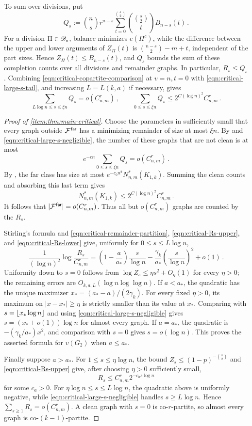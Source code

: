 To sum over divisions, put
$$Q_s:=\binom ns r^{n-s}\sum_{t=0}^{\binom s2}\binom{\binom s2}{t}B_{n-s}(t)\,.$$
For a division $\Pi\in{\mathscr D}_s$, balance minimizes $e(\Pi^c)$, while the difference between the upper and lower arguments of $Z_\Pi(t)$ is $\binom{n-s}{2}-m+t$, independent of the part sizes. Hence $Z_\Pi(t)\leq B_{n-s}(t)$, and $Q_s$ bounds the sum of these completion counts over all divisions and remainder graphs. In particular, $R_s\leq Q_s$. Combining \eqref{eqn:critical-copartite-comparison} at $v=n,t=0$ with \eqref{eqn:critical-large-s-tail}, and increasing $L=L(k,a)$ if necessary, gives
\begin{equation}\label{eqn:critical-large-s-negligible}
\sum_{L\log n\leq s\leq\xi n}Q_s=o(C^r_{n,m})\,,\qquad \sum_{0\leq s\leq\xi n}Q_s\leq2^{C(\log n)^2}C^r_{n,m}\,.
\end{equation}

\begin{proof}[Proof of  \ref{item:thm:main-critical}]
Choose the parameters in  sufficiently small that every graph outside ${\mathcal F}^{\hspace{0.2mm}\mathsf{far}}$ has a minimizing remainder of size at most $\xi n$. By  and \eqref{eqn:critical-large-s-negligible}, the number of these graphs that are not clean is at most
$$e^{-cn}\sum_{0\leq s\leq\xi n}Q_s=o(C^r_{n,m})\,.$$
By , the far class has size at most $e^{-c_0n^2}N^\ast_{n,m}(K_{1,k})$. Summing the clean counts and absorbing this last term gives
$$N^\ast_{n,m}(K_{1,k})\leq2^{C(\log n)^2}C^r_{n,m}\,.$$
It follows that $|{\mathcal F}^{\hspace{0.2mm}\mathsf{far}}|=o(C^r_{n,m})$. Thus all but $o(C^r_{n,m})$ graphs are counted by the $R_s$.

Stirling's formula and \eqref{eqn:critical-remainder-partition}, \eqref{eqn:critical-Rs-upper}, and \eqref{eqn:critical-Rs-lower} give, uniformly for $0\leq s\leq L\log n$,
$$\frac{1}{(\log n)^2}\log\frac{R_s}{C^r_{n,m}}=\left(1-\frac{a}{a_\ast}\right)\frac{s}{\log n}-\frac{\gamma_k}{a_\ast}\left(\frac{s}{\log n}\right)^2+o(1)\,.$$
Uniformity down to $s=0$ follows from $\log Z_s\leq\eta s^2+O_\eta(1)$ for every $\eta>0$; the remaining errors are $O_{k,a,L}(\log n\log\log n)$. If $a<a_\ast$, the quadratic has the unique maximizer $x_\ast=(a_\ast-a)/(2\gamma_k)$. For every fixed $\eta>0$, its maximum on $|x-x_\ast|\geq\eta$ is strictly smaller than its value at $x_\ast$. Comparing with $s=\lfloor x_\ast\log n\rfloor$ and using \eqref{eqn:critical-large-s-negligible} gives $s=(x_\ast+o(1))\log n$ for almost every graph. If $a=a_\ast$, the quadratic is $-(\gamma_k/a_\ast)x^2$, and comparison with $s=0$ gives $s=o(\log n)$. This proves the asserted formula for $v(G_2)$ when $a\leq a_\ast$.

Finally suppose $a>a_\ast$. For $1\leq s\leq\eta\log n$, the bound $Z_s\leq(1-p)^{-\binom s2}$ and \eqref{eqn:critical-Rs-upper} give, after choosing $\eta>0$ sufficiently small,
$$R_s\leq C^r_{n,m}2^{-c_as\log n}$$
for some $c_a>0$. For $\eta\log n\leq s\leq L\log n$, the quadratic above is uniformly negative, while \eqref{eqn:critical-large-s-negligible} handles $s\geq L\log n$. Hence $\sum_{s\geq1}R_s=o(C^r_{n,m})$. A clean graph with $s=0$ is co-$r$-partite, so almost every graph is co-$(k-1)$-partite.
\end{proof}
